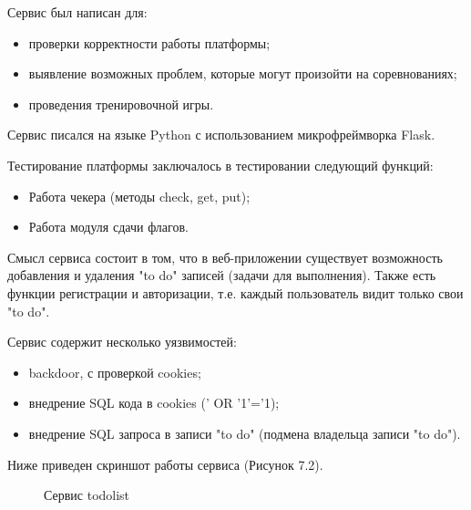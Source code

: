 Сервис был написан для:
\begin{itemize} 
\item проверки корректности работы платформы;
\item выявление возможных проблем, которые могут произойти на соревнованиях;
\item проведения тренировочной игры.
\end{itemize}

Сервис писался на языке Python с использованием микрофреймворка Flask.

Тестирование платформы заключалось в тестировании следующий функций:
\begin{itemize} 
\item Работа чекера (методы check, get, put);
\item Работа модуля сдачи флагов.
\end{itemize}

Смысл сервиса состоит в том, что в веб-приложении существует возможность добавления и удаления "to do" записей (задачи для выполнения). Также есть функции регистрации и авторизации, т.е. каждый пользователь видит только свои "to do".

Сервис содержит несколько уязвимостей:
\begin{itemize} 
\item backdoor, с проверкой cookies;
\item внедрение SQL кода в cookies (' OR '1'='1);
\item внедрение SQL запроса в записи "to do" (подмена владельца записи "to do").
\end{itemize}

Ниже приведен скриншот работы сервиса (Рисунок 7.2).
\begin{figure}[ht!]
\caption{Сервис todolist}
\end{figure}